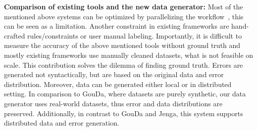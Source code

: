 
\textbf{Comparison of existing tools and the new data generator:} 
Most of the mentioned above systems can be optimized by parallelizing the workflow~\cite{raha, baran, RekatsinasCIR2017, holodetect, RestatGCS2022, jenga}, this can be seen as a limitation.
Another constraint in existing frameworks are hand-crafted rules/constraints or user manual labeling.
Importantly, it is difficult to measure the accuracy of the above mentioned tools without ground truth and mostly existing frameworks use manually cleaned datasets, what is not feasible on scale.
This contribution solves the dilemma of finding ground truth.
Errors are generated not syntactically, but are based on the original data and error distribution.
Moreover, data can be generated either local or in distributed setting.
In comparison to GouDa, where datasets are purely synthetic, our data generator uses real-world datasets,
thus error and data distributions are preserved. 
Additionally, in contrast to GouDa and Jenga, this system supports distributed data and error generation.

